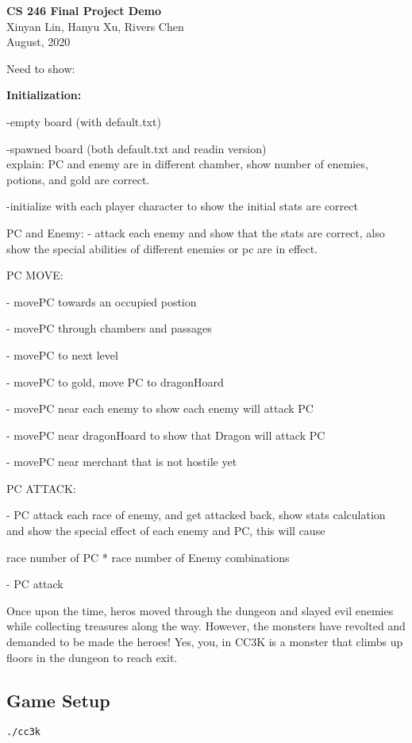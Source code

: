 \documentclass[11pt]{article}
\theoremstyle{plain}
\begin{document}
\begin{center}
{\LARGE \textbf{CS 246 Final Project Demo}}\\
\vspace{0.15 in}
Xinyan Lin, Hanyu Xu, Rivers Chen\\ 
\vspace{0.07 in} August, 2020
\end{center}

\vspace{0.2 in}


Need to show:

\textbf{Initialization:}

-empty board (with default.txt)

-spawned board (both default.txt and readin version)\\
explain: PC and enemy are in different chamber, show number of enemies,
potions, and gold are correct.

-initialize with each player character to show the initial stats are correct





PC and Enemy:
- attack each enemy and show that the stats are correct, also show the 
special abilities of different enemies or pc are in effect.

PC MOVE:

- movePC towards an occupied postion

- movePC through chambers and passages

- movePC to next level

- movePC to gold, move PC to dragonHoard

- movePC near each enemy to show each enemy will attack PC

- movePC near dragonHoard to show that Dragon will attack PC

- movePC near merchant that is not hostile yet


PC ATTACK:

- PC attack each race of enemy, and get attacked back, show stats calculation
and show the special effect of each enemy and PC, this will cause 

race number of PC * race number of Enemy combinations

- PC attack 
\newpage


Once upon the time, heros moved through the dungeon and slayed evil enemies 
while collecting treasures along the way. However, the monsters have revolted
and demanded to be made the heroes!
Yes, you, in CC3K is a monster that climbs up floors in the dungeon to
reach exit.


\subsection{Game Setup}

\begin{lstlisting}
./cc3k 
\end{lstlisting}
\end{document}
